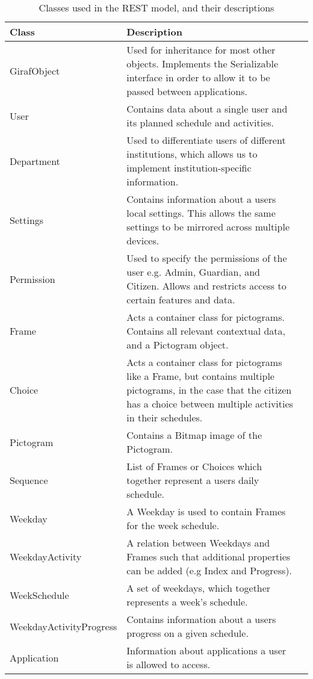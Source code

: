 \begin{table}[H] 
\begin{centering}
\begin{tabular}{|l|p{9cm}|l|}
\hline 
Class 					&	Description	\\ \hline
GirafObject				&	Used for inheritance for most other objects. Implements the
Serializable interface in order to allow it to be passed between applications. \\\hline 
User					&	Contains data about a single user and its planned
schedule and activities.\\\hline 
Department  			&	Used to differentiate users of
different institutions, which allows us to implement institution-specific information.\\\hline 
Settings    			&	Contains information about a users local settings. This allows
the same settings to be mirrored across multiple devices. \\\hline 
Permission  			&	Used to specify the permissions of the user e.g. Admin,
Guardian, and Citizen. Allows and restricts access to certain features and data.\\\hline 
Frame              		&   Acts a container class for pictograms. Contains all
relevant contextual data, and a Pictogram object.\\\hline 
Choice              	&	Acts a container class for pictograms like a Frame, but
contains multiple pictograms, in the case that the citizen has a choice between
multiple activities in their schedules.\\\hline 
Pictogram              	&	Contains a Bitmap image of the Pictogram. \\\hline
Sequence              	&	List of Frames or Choices which together represent a
users daily schedule. \\\hline 
Weekday              	&	A Weekday is used to contain Frames for the week
schedule.                  \\ \hline 
WeekdayActivity			& A relation between Weekdays and Frames such that additional
properties can be added (e.g Index and Progress).\\\hline 
WeekSchedule         	&	A set of weekdays, which together represents a week's
schedule.\\\hline 
WeekdayActivityProgress & 	Contains information about a users progress on a
given schedule.\\\hline 
Application    			&	Information about applications a user is allowed to access.\\\hline     
\end{tabular}
\label{restModelTableEh}
\caption{Classes used in the REST model, and their descriptions}
\end{centering}
\end{table}

